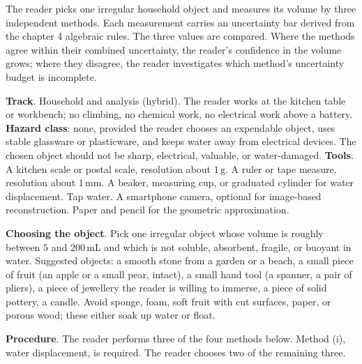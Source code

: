 \begin{project}
The reader picks one irregular household object and measures its
volume by three independent methods. Each measurement carries an
uncertainty bar derived from the chapter 4 algebraic rules. The
three values are compared. Where the methods agree within their
combined uncertainty, the reader's confidence in the volume grows;
where they disagree, the reader investigates which method's
uncertainty budget is incomplete.

\textbf{Track}. Household and analysis (hybrid). The reader works at
the kitchen table or workbench; no climbing, no chemical work, no
electrical work above a battery. \textbf{Hazard class}: none,
provided the reader chooses an expendable object, uses stable
glassware or plasticware, and keeps water away from electrical
devices. The chosen object should not be sharp, electrical,
valuable, or water-damaged. \textbf{Tools}. A kitchen scale or
postal scale, resolution about $1 \,\si{\gram}$. A ruler or tape
measure, resolution about $1 \,\si{\milli\meter}$. A beaker,
measuring cup, or graduated cylinder for water displacement. Tap
water. A smartphone camera, optional for image-based
reconstruction. Paper and pencil for the geometric approximation.

\textbf{Choosing the object}. Pick one irregular object whose volume
is roughly between $5$ and $200 \,\si{\milli\liter}$ and which is
not soluble, absorbent, fragile, or buoyant in water. Suggested
objects: a smooth stone from a garden or a beach, a small piece of
fruit (an apple or a small pear, intact), a small hand tool (a
spanner, a pair of pliers), a piece of jewellery the reader is
willing to immerse, a piece of solid pottery, a candle. Avoid sponge,
foam, soft fruit with cut surfaces, paper, or porous wood; these
either soak up water or float.

\textbf{Procedure}. The reader performs three of the four methods
below. Method (i), water displacement, is required. The reader
chooses two of the remaining three.


\end{project}
